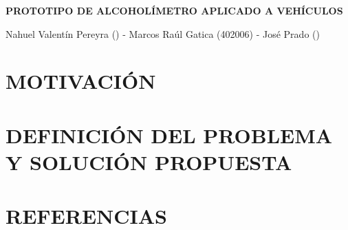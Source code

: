 \documentclass[a4paper,11pt]{article}
\title{}
\author{}
\date{}
\begin{document}
	
	\begin{center}
		\textbf{\fontsize{15pt}{17pt}\selectfont PROTOTIPO DE ALCOHOLÍMETRO APLICADO A VEHÍCULOS}
		
		Nahuel Valentín Pereyra () - Marcos Raúl Gatica (402006) - José Prado ()
		
	\end{center}
	
		
	\begin{multicols}{2}
		
		\section{MOTIVACIÓN}
		
		\section{DEFINICIÓN DEL PROBLEMA Y SOLUCIÓN PROPUESTA}
		
		\section{REFERENCIAS}
		
		
	\end{multicols}
	
\end{document}
